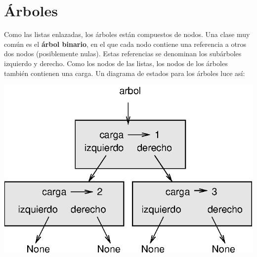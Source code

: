 

%

\chapter{Árboles}

Como las listas enlazadas, los árboles están compuestos de nodos. Una clase
muy común es el {\bf árbol binario}, en el que cada nodo contiene
una referencia a otros dos nodos (posiblemente nulas). Estas referencias
se denominan los subárboles izquierdo y derecho. Como los nodos de las
listas, los nodos de los árboles también contienen una carga. Un diagrama
de estados para los árboles luce así:

\label{tree}
\beforefig
\centerline{\includegraphics{illustrations/tree1.eps}}
\afterfig

